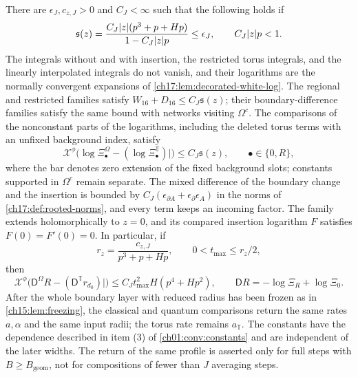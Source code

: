 \begin{theorem}
There are $\epsilon_J,c_{z,J}>0$ and $C_J<\infty$ such that the following holds if
\[
 \mathfrak s(z)=\frac{C_J\lvert z\rvert(p^3+p+Hp)}{1-C_J\lvert z\rvert p}\le\epsilon_J,\qquad C_J\lvert z\rvert p<1.
\]
The integrals without and with insertion, the restricted torus integrals, and the linearly interpolated integrals do not vanish, and their logarithms are the normally convergent expansions of \cref{ch17:lem:decorated-white-log}. The regional and restricted families satisfy $W_{16}+D_{16}\le C_J\mathfrak s(z)$; their boundary-difference families satisfy the same bound with networks visiting $\Omega^c$. The comparisons of the nonconstant parts of the logarithms, including the deleted torus terms with an unfixed background index, satisfy
\[
 \mathcal X^\phi\bigl(\log\Xi_\bullet^\Omega-(\log\Xi_\bullet^{\mathbb T})|\bigr)\le C_J\mathfrak s(z),\qquad\bullet\in\{0,R\},
\]
where the bar denotes zero extension of the fixed background slots; constants supported in $\Omega^c$ remain separate. The mixed difference of the boundary change and the insertion is bounded by $C_J(\epsilon_{\partial A}+\epsilon_\partial\epsilon_A)$ in the norms of \cref{ch17:def:rooted-norms}, and every term keeps an incoming factor. The family extends holomorphically to $z=0$, and its compared insertion logarithm $F$ satisfies $F(0)=F'(0)=0$. In particular, if
\[
 r_z=\frac{c_{z,J}}{p^3+p+Hp},\qquad0<t_{\max}\le r_z/2,
\]
then
\[
 \mathcal X^\phi\bigl(\mathsf D^\Omega R-(\mathsf D^{\mathbb T}r_{d_0})|\bigr)\le C_Jt_{\max}^2H(p^4+Hp^2),\qquad\mathsf DR=-\log\Xi_R+\log\Xi_0.
\]
After the whole boundary layer with reduced radius has been frozen as in \cref{ch15:lem:freezing}, the classical and quantum comparisons return the same rates $a,\alpha$ and the same input radii; the torus rate remains $a_{\mathbb T}$. The constants have the dependence described in item (3) of \cref{ch01:conv:constants} and are independent of the later widths. The return of the same profile is asserted only for full steps with $B\ge B_{\mathrm{geom}}$, not for compositions of fewer than $J$ averaging steps.
\end{theorem}

